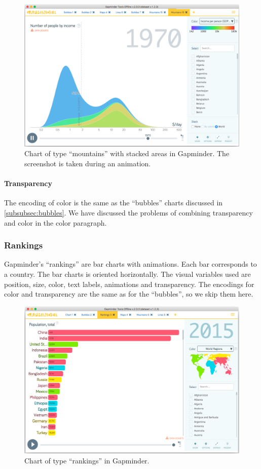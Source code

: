 \begin{figure}[h]
	\centering
	\includegraphics[width=0.95\columnwidth]{figures/mountains-animation}
	\caption{Chart of type ``mountains'' with stacked areas in Gapminder. The screenshot is taken during an animation.}
	\label{fig:mountains-animation}
\end{figure}

\paragraph{Transparency}
The encoding of color is the same as the ``bubbles'' charts discussed in \cref{subsubsec:bubbles}.
We have discussed the problems of combining transparency and color in the color paragraph.


\subsubsection{Rankings}
\label{subsubsec:rankings}
Gapminder's ``rankings'' are bar charts with animations.
Each bar corresponds to a country.
The bar charts is oriented horizontally.
The visual variables used are position, size, color, text labels, animations and transparency.
The encodings for color and transparency are the same as for the ``bubbles'', so we skip them here.

\begin{figure}[h]
	\centering
	\includegraphics[width=0.95\columnwidth]{figures/rankings}
	\caption{Chart of type ``rankings'' in Gapminder.}
	\label{fig:rankings}
\end{figure}

